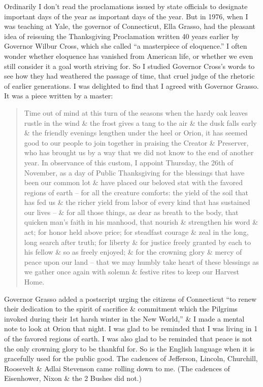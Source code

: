 \documentclass{article}
\numberwithin{equation}{section}
\begin{document}
Ordinarily I don't read the proclamations issued by state officials to designate important days of the year as important days of the year. But in 1976, when I was teaching at Yale, the governor of Connecticut, Ella Grasso, had the pleasant idea of reissuing the Thanksgiving Proclamation written 40 years earlier by Governor Wilbur Cross, which she called ``a masterpiece of eloquence.'' I often wonder whether eloquence has vanished from American life, or whether we even still consider it a goal worth striving for. So I studied Governor Cross's words to see how they had weathered the passage of time, that cruel judge of the rhetoric of earlier generations. I was delighted to find that I agreed with Governor Grasso. It was a piece written by a master:
\begin{quotation}
	Time out of mind at this turn of the seasons when the hardy oak leaves rustle in the wind \& the frost gives a tang to the air \& the dusk falls early \& the friendly evenings lengthen under the heel or Orion, it has seemed good to our people to join together in praising the Creator \& Preserver, who has brought us by a way that we did not know to the end of another year. In observance of this custom, I appoint Thursday, the 26th of November, as a day of Public Thanksgiving for the blessings that have been our common lot \& have placed our beloved stat with the favored regions of earth -- for all the creature comforts: the yield of the soil that has fed us \& the richer yield from labor of every kind that has sustained our lives -- \& for all those things, as dear as breath to the body, that quicken man's faith in his manhood, that nourish \& strengthen his word \& act; for honor held above price; for steadfast courage \& zeal in the long, long search after truth; for liberty \& for justice freely granted by each to his fellow \& so as freely enjoyed; \& for the crowning glory \& mercy of peace upon our land -- that we may humbly take heart of these blessings as we gather once again with solemn \& festive rites to keep our Harvest Home.
\end{quotation}
Governor Grasso added a postscript urging the citizens of Connecticut ``to renew their dedication to the spirit of sacrifice \& commitment which the Pilgrims invoked during their 1st harsh winter in the New World,'' \& I made a mental note to look at Orion that night. I was glad to be reminded that I was living in 1 of the favored regions of earth. I was also glad to be reminded that peace is not the only crowning glory to be thankful for. So is the English language when it is gracefully used for the public good. The cadences of Jefferson, Lincoln, Churchill, Roosevelt \& Adlai Stevenson came rolling down to me. (The cadences of Eisenhower, Nixon \& the 2 Bushes did not.)
\end{document}
